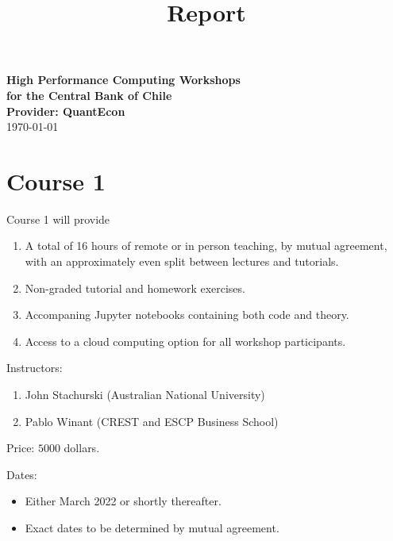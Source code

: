 \documentclass[12pt]{article}
\begin{document}
\title{Report}

\date{}


\begin{center}
    {\bf {\Large High Performance Computing Workshops \\
            for the Central Bank of Chile
    \\
    \vspace{1em}
    Provider: QuantEcon \\
    }}
    \vspace{1em}
    \today
\end{center}


\vspace{.01in}







\thispagestyle{fancy}
\section*{Course 1}

Course 1 will provide 
%
\begin{enumerate}
    \item A total of 16 hours of remote or in person teaching, by mutual
        agreement, with an approximately even split between lectures and
        tutorials.
    \item Non-graded tutorial and homework exercises.
    \item Accompaning Jupyter notebooks containing both code and theory.
    \item Access to a cloud computing option for all workshop participants.
\end{enumerate}

Instructors:
%
\begin{enumerate}
    \item John Stachurski (Australian National University)
    \item Pablo Winant (CREST and ESCP Business School)
\end{enumerate}

Price: $5000$ dollars.

Dates: 
%
\begin{itemize}
    \item Either March 2022 or shortly thereafter.
    \item Exact dates to be determined by mutual agreement.
\end{itemize}
\end{document}
